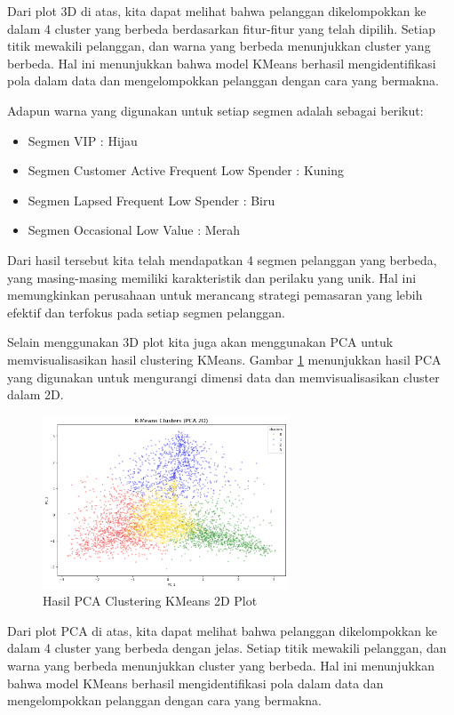 Dari plot 3D di atas, kita dapat melihat bahwa pelanggan dikelompokkan ke dalam 4 cluster yang berbeda berdasarkan fitur-fitur yang telah dipilih. Setiap titik mewakili pelanggan, dan warna yang berbeda menunjukkan cluster yang berbeda. Hal ini menunjukkan bahwa model KMeans berhasil mengidentifikasi pola dalam data dan mengelompokkan pelanggan dengan cara yang bermakna.

Adapun warna yang digunakan untuk setiap segmen adalah sebagai berikut:
\begin{itemize}
    \item Segmen VIP : Hijau
    \item Segmen Customer Active Frequent Low Spender : Kuning
    \item Segmen Lapsed Frequent Low Spender : Biru
    \item Segmen Occasional Low Value : Merah
\end{itemize}

Dari hasil tersebut kita telah mendapatkan 4 segmen pelanggan yang berbeda, yang masing-masing memiliki karakteristik dan perilaku yang unik. Hal ini memungkinkan perusahaan untuk merancang strategi pemasaran yang lebih efektif dan terfokus pada setiap segmen pelanggan.

Selain menggunakan 3D plot kita juga akan menggunakan PCA untuk memvisualisasikan hasil clustering KMeans. Gambar \ref{fig:pca_kmeans} menunjukkan hasil PCA yang digunakan untuk mengurangi dimensi data dan memvisualisasikan cluster dalam 2D.

\begin{figure}[H]
    \centering
    \includegraphics[width=0.65\textwidth]{gambar/PCA.png}
    \caption{Hasil PCA Clustering KMeans 2D Plot}
    \label{fig:pca_kmeans}
\end{figure}

Dari plot PCA di atas, kita dapat melihat bahwa pelanggan dikelompokkan ke dalam 4 cluster yang berbeda dengan jelas. Setiap titik mewakili pelanggan, dan warna yang berbeda menunjukkan cluster yang berbeda. Hal ini menunjukkan bahwa model KMeans berhasil mengidentifikasi pola dalam data dan mengelompokkan pelanggan dengan cara yang bermakna.

